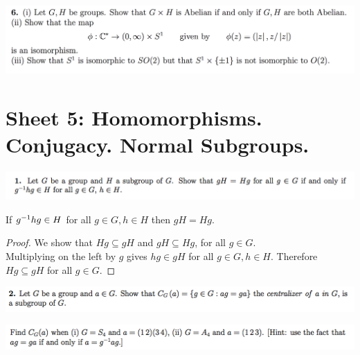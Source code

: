 \documentclass[12pt]{article}
\begin{document}
\begin{mdframed}
\includegraphics[width=400pt]{img/oxford-prelims-M1-groups-1-6.png}
\end{mdframed}

\newpage
\section{Sheet 5: Homomorphisms. Conjugacy. Normal Subgroups.}

\begin{mdframed}
\includegraphics[width=400pt]{img/abstract-algebra-oxford-M1-5-1.png}
\end{mdframed}

\begin{claim*}
  If $g^{-1}hg \in H$ for all $g \in G, h \in H$ then $gH = Hg$.
\end{claim*}

\begin{proof} We show that $Hg \subseteq gH$ and $gH \subseteq Hg$, for all $g \in G$.\\

Multiplying on the left by $g$ gives $hg \in gH$ for all $g \in G, h \in H$. Therefore $Hg \subseteq gH$ for all $g \in G$.
\end{proof}

\begin{mdframed}
\includegraphics[width=400pt]{img/abstract-algebra-oxford-M1-5-2-1.png}
\end{mdframed}

\begin{mdframed}
\includegraphics[width=400pt]{img/abstract-algebra-oxford-M1-5-2-2.png}
\end{mdframed}
\end{document}
